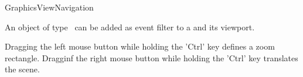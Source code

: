 
\begin{ccRefClass}{GraphicsViewNavigation}

\ccDefinition
An object of type \ccRefName\ can be added as event filter to a  and its viewport.

Dragging the left mouse button while holding the 'Ctrl' key defines a zoom rectangle.
Dragginf the right mouse button while holding the 'Ctrl' key translates the scene.





\end{ccRefClass}







